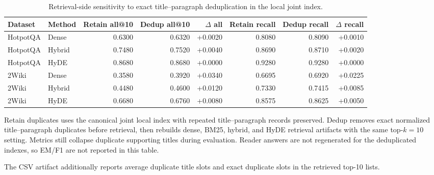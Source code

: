 \begin{table}[t]
\centering
\caption{Retrieval-side sensitivity to exact title--paragraph deduplication in the local joint index.}
\label{tab:dedup_retrieval_sensitivity}
\footnotesize
\begin{threeparttable}
\setlength{\tabcolsep}{2pt}
\begin{tabularx}{\textwidth}{>{\raggedright\arraybackslash}X l r r r r r r}
\toprule
Dataset & Method & Retain all@10 & Dedup all@10 & $\Delta$ all & Retain recall & Dedup recall & $\Delta$ recall \\
\midrule
HotpotQA & Dense & 0.6300 & 0.6320 & +0.0020 & 0.8080 & 0.8090 & +0.0010 \\
HotpotQA & Hybrid & 0.7480 & 0.7520 & +0.0040 & 0.8690 & 0.8710 & +0.0020 \\
HotpotQA & HyDE & 0.8680 & 0.8680 & +0.0000 & 0.9280 & 0.9280 & +0.0000 \\
2Wiki & Dense & 0.3580 & 0.3920 & +0.0340 & 0.6695 & 0.6920 & +0.0225 \\
2Wiki & Hybrid & 0.4480 & 0.4600 & +0.0120 & 0.7330 & 0.7415 & +0.0085 \\
2Wiki & HyDE & 0.6680 & 0.6760 & +0.0080 & 0.8575 & 0.8625 & +0.0050 \\
\bottomrule
\end{tabularx}
\begin{tablenotes}
\footnotesize
\item Retain duplicates uses the canonical joint local index with repeated title--paragraph records preserved. Dedup removes exact normalized title--paragraph duplicates before retrieval, then rebuilds dense, BM25, hybrid, and HyDE retrieval artifacts with the same top-$k=10$ setting. Metrics still collapse duplicate supporting titles during evaluation. Reader answers are not regenerated for the deduplicated indexes, so EM/F1 are not reported in this table.
\item The CSV artifact additionally reports average duplicate title slots and exact duplicate slots in the retrieved top-10 lists.
\end{tablenotes}
\end{threeparttable}
\end{table}
